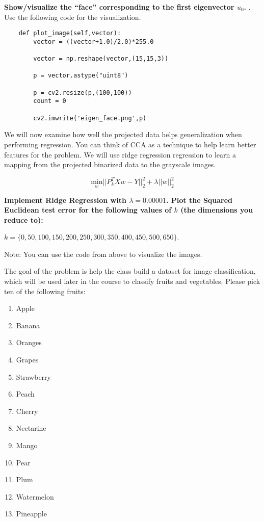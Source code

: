 \begin{Parts}
{\bf Show/visualize the ``face'' corresponding to the first eigenvector $u_0$. }. Use the following code for the visualization. 

\begin{lstlisting}
	def plot_image(self,vector):
		vector = ((vector+1.0)/2.0)*255.0

		vector = np.reshape(vector,(15,15,3))

		p = vector.astype("uint8")

		p = cv2.resize(p,(100,100))
		count = 0

		cv2.imwrite('eigen_face.png',p)
\end{lstlisting}





\Part We will now examine how well the projected data helps
generalization when performing regression. You can think of CCA as a
technique to help learn better features for the problem. We will use
ridge regression regression to learn a mapping from the projected
binarized data to the grayscale images. 

$$\underset{w}{\mbox{min}} ||P_k^TX w - Y||^2_2 + \lambda||w||^2_2$$


{\bf Implement Ridge Regression with $\lambda = 0.00001$. Plot the
  Squared Euclidean test error for the following values of $k$ (the
  dimensions you reduce to):

$k = \lbrace 0,50,100,150,200,250,300,350,400,450,500,650 \rbrace$.}



 Note: You can use the code from above to visualize the images.










\end{Parts}

The goal of the problem is help the class build a dataset for image classification, which will be used later in the course to classify fruits and vegetables. Please pick ten of the following fruits:

\begin{enumerate}
\item Apple
\item Banana
\item Oranges
\item Grapes
\item Strawberry
\item Peach
\item Cherry
\item Nectarine
\item Mango
\item Pear
\item Plum
\item Watermelon
\item Pineapple
\end{enumerate}


